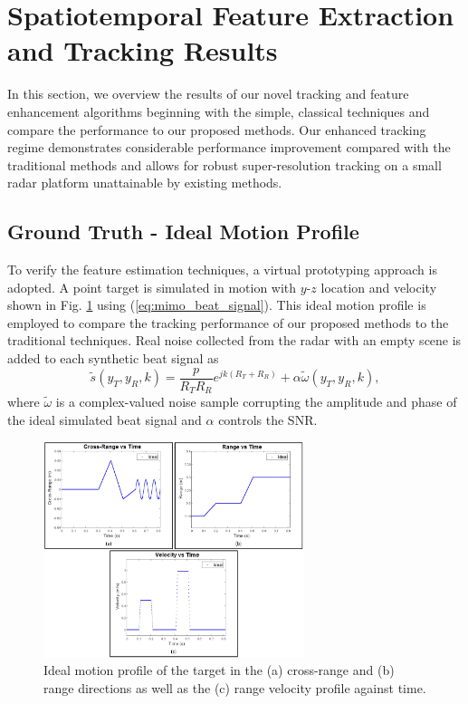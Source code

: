 \documentclass[10pt,journal,final]{IEEEtran}
\begin{document}
\section{Spatiotemporal Feature Extraction and Tracking Results}
\label{sec:results}

In this section, we overview the results of our novel tracking and feature enhancement algorithms beginning with the simple, classical techniques and compare the performance to our proposed methods.
Our enhanced tracking regime demonstrates considerable performance improvement compared with the traditional methods and allows for robust super-resolution tracking on a small radar platform unattainable by existing methods.

\subsection{Ground Truth - Ideal Motion Profile}
\label{subsec:ideal_motion_profile}

To verify the feature estimation techniques, a virtual prototyping approach is adopted. A point target is simulated in motion with $y$-$z$ location and velocity shown in Fig. \ref{fig:ideal_motion} using (\ref{eq:mimo_beat_signal}). 
This ideal motion profile is employed to compare the tracking performance of our proposed methods to the traditional techniques. 
Real noise collected from the radar with an empty scene is added to each synthetic beat signal as
\begin{equation}
\label{eq:beat_sim_with_noise}
	\tilde{s}(y_T,y_R,k) = \frac{p}{R_T R_R}e^{jk(R_T + R_R)} + \alpha \tilde{ \omega}(y_T,y_R,k),
\end{equation}
where $\tilde{ \omega}$ is a complex-valued noise sample corrupting the amplitude and phase of the ideal simulated beat signal and $\alpha$ controls the SNR.

\begin{figure}[h]
	\centering
	\includegraphics[width=3in]{smith8.jpg}
	\caption{Ideal motion profile of the target in the (a) cross-range and (b) range directions as well as the (c) range velocity profile against time.}
	\label{fig:ideal_motion}
\end{figure}
\end{document}
